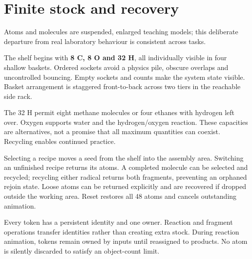 \section*{Finite stock and recovery}
Atoms and molecules are suspended, enlarged teaching models; this deliberate departure from real laboratory behaviour is consistent across tasks.

The shelf begins with \textbf{8 C, 8 O and 32 H}, all individually visible in four shallow baskets. Ordered sockets avoid a physics pile, obscure overlaps and uncontrolled bouncing. Empty sockets and counts make the system state visible. Basket arrangement is staggered front-to-back across two tiers in the reachable side rack.



The 32 H permit eight methane molecules or four ethanes with hydrogen left over. Oxygen supports water and the hydrogen/oxygen reaction. These capacities are alternatives, not a promise that all maximum quantities can coexist. Recycling enables continued practice.

Selecting a recipe moves a seed from the shelf into the assembly area. Switching an unfinished recipe returns its atoms. A completed molecule can be selected and recycled; recycling either radical returns both fragments, preventing an orphaned rejoin state. Loose atoms can be returned explicitly and are recovered if dropped outside the working area. Reset restores all 48 atoms and cancels outstanding animation.



Every token has a persistent identity and one owner. Reaction and fragment operations transfer identities rather than creating extra stock. During reaction animation, tokens remain owned by inputs until reassigned to products. No atom is silently discarded to satisfy an object-count limit.
